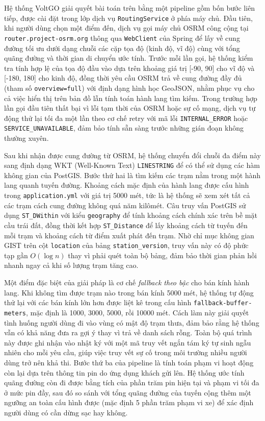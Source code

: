 \documentclass[../Main.tex]{subfiles}
\begin{document}
Hệ thống VoltGO giải quyết bài toán trên bằng một pipeline gồm bốn bước liên tiếp, được cài đặt trong lớp dịch vụ \texttt{RoutingService} ở phía máy chủ. Đầu tiên, khi người dùng chọn một điểm đến, dịch vụ gọi máy chủ OSRM công cộng tại \texttt{router.project-osrm.org} thông qua \texttt{WebClient} của Spring để lấy về cung đường tối ưu dưới dạng chuỗi các cặp tọa độ (kinh độ, vĩ độ) cùng với tổng quãng đường và thời gian di chuyển ước tính. Trước mỗi lần gọi, hệ thống kiểm tra tính hợp lệ của tọa độ đầu vào dựa trên khoảng giá trị [-90, 90] cho vĩ độ và [-180, 180] cho kinh độ, đồng thời yêu cầu OSRM trả về cung đường đầy đủ (tham số \texttt{overview=full}) với định dạng hình học GeoJSON, nhằm phục vụ cho cả việc hiển thị trên bản đồ lẫn tính toán hành lang tìm kiếm. Trong trường hợp lần gọi đầu tiên thất bại vì lỗi tạm thời của OSRM hoặc sự cố mạng, dịch vụ tự động thử lại tối đa một lần theo cơ chế retry với mã lỗi \texttt{INTERNAL\_ERROR} hoặc \texttt{SERVICE\_UNAVAILABLE}, đảm bảo tính sẵn sàng trước những gián đoạn không thường xuyên.

Sau khi nhận được cung đường từ OSRM, hệ thống chuyển đổi chuỗi đa điểm này sang định dạng WKT (Well-Known Text) \texttt{LINESTRING} để có thể sử dụng các hàm không gian của PostGIS. Bước thứ hai là tìm kiếm các trạm nằm trong một hành lang quanh tuyến đường. Khoảng cách mặc định của hành lang được cấu hình trong \texttt{application.yml} với giá trị 5000 mét, tức là hệ thống sẽ xem xét tất cả các trạm cách cung đường không quá năm kilômét. Câu truy vấn PostGIS sử dụng \texttt{ST\_DWithin} với kiểu \texttt{geography} để tính khoảng cách chính xác trên bề mặt cầu trái đất, đồng thời kết hợp \texttt{ST\_Distance} để lấy khoảng cách từ tuyến đến mỗi trạm và khoảng cách từ điểm xuất phát đến trạm. Nhờ chỉ mục không gian GIST trên cột \texttt{location} của bảng \texttt{station\_version}, truy vấn này có độ phức tạp gần $O(\log n)$ thay vì phải quét toàn bộ bảng, đảm bảo thời gian phản hồi nhanh ngay cả khi số lượng trạm tăng cao.

Một điểm đặc biệt của giải pháp là cơ chế \emph{fallback theo bậc} cho bán kính hành lang. Khi không tìm được trạm nào trong bán kính 5000 mét, hệ thống tự động thử lại với các bán kính lớn hơn được liệt kê trong cấu hình \texttt{fallback-buffer-meters}, mặc định là 1000, 3000, 5000, rồi 10000 mét. Cách làm này giải quyết tình huống người dùng đi vào vùng có mật độ trạm thưa, đảm bảo rằng hệ thống vẫn có khả năng đưa ra gợi ý thay vì trả về danh sách rỗng. Toàn bộ quá trình này được ghi nhận vào nhật ký với một mã truy vết ngắn tám ký tự sinh ngẫu nhiên cho mỗi yêu cầu, giúp việc truy vết sự cố trong môi trường nhiều người dùng trở nên khả thi. Bước thứ ba của pipeline là tính toán phạm vi hoạt động còn lại dựa trên thông tin pin do ứng dụng khách gửi lên. Hệ thống ước tính quãng đường còn đi được bằng tích của phần trăm pin hiện tại và phạm vi tối đa ở mức pin đầy, sau đó so sánh với tổng quãng đường của tuyến cộng thêm một ngưỡng an toàn cấu hình được (mặc định 5 phần trăm phạm vi xe) để xác định người dùng có cần dừng sạc hay không.
\end{document}
